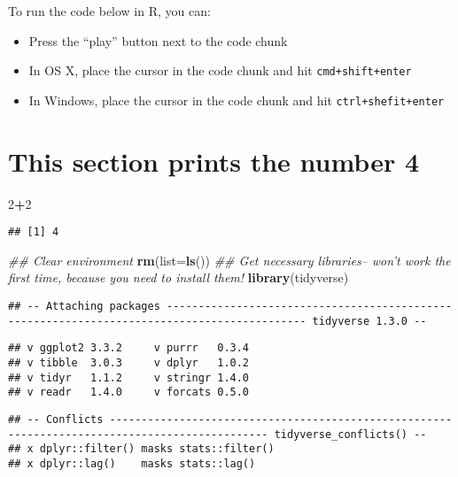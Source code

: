 \documentclass[
]{article}
\newenvironment{Shaded}{\begin{snugshade}}{\end{snugshade}}
\newcommand{\CommentTok}[1]{\textcolor[rgb]{0.56,0.35,0.01}{\textit{#1}}}
\newcommand{\DataTypeTok}[1]{\textcolor[rgb]{0.13,0.29,0.53}{#1}}
\newcommand{\DecValTok}[1]{\textcolor[rgb]{0.00,0.00,0.81}{#1}}
\newcommand{\KeywordTok}[1]{\textcolor[rgb]{0.13,0.29,0.53}{\textbf{#1}}}
\newcommand{\NormalTok}[1]{#1}
\newcommand{\OperatorTok}[1]{\textcolor[rgb]{0.81,0.36,0.00}{\textbf{#1}}}
\providecommand{\tightlist}{%
  \setlength{\itemsep}{0pt}\setlength{\parskip}{0pt}}
\begin{document}
To run the code below in R, you can:

\begin{itemize}
\tightlist
\item
  Press the ``play'' button next to the code chunk
\item
  In OS X, place the cursor in the code chunk and hit
  \texttt{cmd+shift+enter}
\item
  In Windows, place the cursor in the code chunk and hit
  \texttt{ctrl+shefit+enter}
\end{itemize}

\hypertarget{this-section-prints-the-number-4}{%
\section{This section prints the number
4}\label{this-section-prints-the-number-4}}

\begin{Shaded}
\begin{Highlighting}[]
\DecValTok{2}\OperatorTok{+}\DecValTok{2}
\end{Highlighting}
\end{Shaded}

\begin{verbatim}
## [1] 4
\end{verbatim}

\begin{Shaded}
\begin{Highlighting}[]
\CommentTok{## Clear environment}
\KeywordTok{rm}\NormalTok{(}\DataTypeTok{list=}\KeywordTok{ls}\NormalTok{())}
\CommentTok{## Get necessary libraries-- won't work the first time, because you need to install them!}
\KeywordTok{library}\NormalTok{(tidyverse)}
\end{Highlighting}
\end{Shaded}

\begin{verbatim}
## -- Attaching packages -------------------------------------------------------------------------------------------- tidyverse 1.3.0 --
\end{verbatim}

\begin{verbatim}
## v ggplot2 3.3.2     v purrr   0.3.4
## v tibble  3.0.3     v dplyr   1.0.2
## v tidyr   1.1.2     v stringr 1.4.0
## v readr   1.4.0     v forcats 0.5.0
\end{verbatim}

\begin{verbatim}
## -- Conflicts ----------------------------------------------------------------------------------------------- tidyverse_conflicts() --
## x dplyr::filter() masks stats::filter()
## x dplyr::lag()    masks stats::lag()
\end{verbatim}
\end{document}
